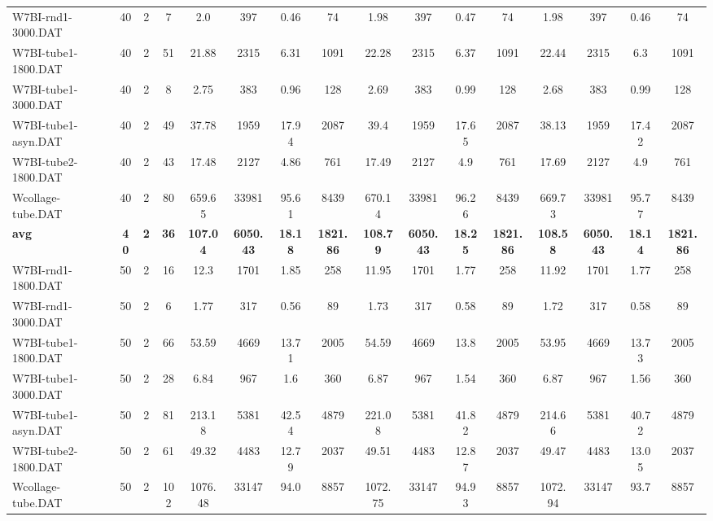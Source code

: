 \begin{sidewaystable}[!ht]
{\begin{tabular}{lccccccccccccccc}
W7BI-rnd1-3000.DAT & 40 & 2 & 7 & 2.0 & 397 &  \textcolor{blue2}{0.46} & 74 & 1.98 & 397 & 0.47 & 74 & 1.98 & 397 &  \textcolor{blue2}{0.46} & 74 \\
W7BI-tube1-1800.DAT & 40 & 2 & 51 & 21.88 & 2315 & 6.31 & 1091 & 22.28 & 2315 & 6.37 & 1091 & 22.44 & 2315 &  \textcolor{blue2}{6.3} & 1091 \\
W7BI-tube1-3000.DAT & 40 & 2 & 8 & 2.75 & 383 &  \textcolor{blue2}{0.96} & 128 & 2.69 & 383 & 0.99 & 128 & 2.68 & 383 & 0.99 & 128 \\
W7BI-tube1-asyn.DAT & 40 & 2 & 49 & 37.78 & 1959 & 17.94 & 2087 & 39.4 & 1959 & 17.65 & 2087 & 38.13 & 1959 &  \textcolor{blue2}{17.42} & 2087 \\
W7BI-tube2-1800.DAT & 40 & 2 & 43 & 17.48 & 2127 &  \textcolor{blue2}{4.86} & 761 & 17.49 & 2127 & 4.9 & 761 & 17.69 & 2127 & 4.9 & 761 \\
Wcollage-tube.DAT & 40 & 2 & 80 & 659.65 & 33981 &  \textcolor{blue2}{95.61} & 8439 & 670.14 & 33981 & 96.26 & 8439 & 669.73 & 33981 & 95.77 & 8439 \\
\cline{1-16} \textbf{avg} & \textbf{40} & \textbf{2} & \textbf{36} & \textbf{107.04} & \textbf{6050.43} & \textbf{18.18} & \textbf{1821.86} & \textbf{108.79} & \textbf{6050.43} & \textbf{18.25} & \textbf{1821.86} & \textbf{108.58} & \textbf{6050.43} & \textbf{18.14} & \textbf{1821.86} \\ \cline{1-16}
W7BI-rnd1-1800.DAT & 50 & 2 & 16 & 12.3 & 1701 & 1.85 & 258 & 11.95 & 1701 &  \textcolor{blue2}{1.77} & 258 & 11.92 & 1701 &  \textcolor{blue2}{1.77} & 258 \\
W7BI-rnd1-3000.DAT & 50 & 2 & 6 & 1.77 & 317 &  \textcolor{blue2}{0.56} & 89 & 1.73 & 317 & 0.58 & 89 & 1.72 & 317 & 0.58 & 89 \\
W7BI-tube1-1800.DAT & 50 & 2 & 66 & 53.59 & 4669 &  \textcolor{blue2}{13.71} & 2005 & 54.59 & 4669 & 13.8 & 2005 & 53.95 & 4669 & 13.73 & 2005 \\
W7BI-tube1-3000.DAT & 50 & 2 & 28 & 6.84 & 967 & 1.6 & 360 & 6.87 & 967 &  \textcolor{blue2}{1.54} & 360 & 6.87 & 967 & 1.56 & 360 \\
W7BI-tube1-asyn.DAT & 50 & 2 & 81 & 213.18 & 5381 & 42.54 & 4879 & 221.08 & 5381 & 41.82 & 4879 & 214.66 & 5381 &  \textcolor{blue2}{40.72} & 4879 \\
W7BI-tube2-1800.DAT & 50 & 2 & 61 & 49.32 & 4483 &  \textcolor{blue2}{12.79} & 2037 & 49.51 & 4483 & 12.87 & 2037 & 49.47 & 4483 & 13.05 & 2037 \\
Wcollage-tube.DAT & 50 & 2 & 102 & 1076.48 & 33147 & 94.0 & 8857 & 1072.75 & 33147 & 94.93 & 8857 & 1072.94 & 33147 &  \textcolor{blue2}{93.7} & 8857 \\

\end{tabular}}
\end{sidewaystable}
